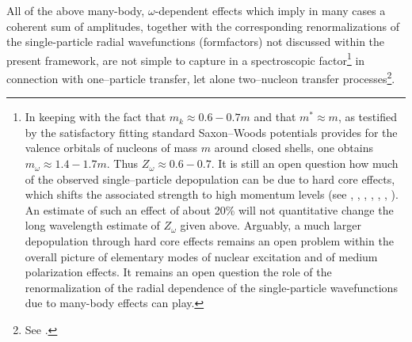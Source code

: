 All of the above many-body, $\omega$-dependent effects which imply in many cases a coherent sum of amplitudes, together with the corresponding renormalizations of the single-particle radial wavefunctions (formfactors) not discussed within the present framework, are not simple to capture in a spectroscopic factor\footnote{In keeping with the fact that $m_k\approx 0.6-0.7 m$ and that $m^*\approx m$, as testified by the satisfactory fitting standard Saxon--Woods potentials provides for the valence orbitals of nucleons of mass $m$ around closed shells, one obtains $m_\omega\approx 1.4-1.7 m$. Thus $Z_\omega \approx 0.6-0.7$. It is still an open question how much of the observed single--particle depopulation can be due to hard core effects, which shifts the associated strength to high momentum levels (see \cite{Dickhoff:05}, \cite{Jenning:11}, \cite{Kramer:01}, \cite{Barbieri:09}, \cite{Schiffer:12}, \cite{Duguet:12}, \cite{Furnstahl:10}).  An estimate of such an effect of about 20\% will not quantitative change the long wavelength estimate of $Z_\omega$ given above. Arguably, a much larger depopulation through hard core effects remains an open problem within the overall picture of elementary modes of nuclear excitation and of medium polarization effects. It remains an open question  the role of the renormalization of the radial dependence of the single-particle wavefunctions due to many-body effects can play.} in connection with one--particle transfer, let alone two--nucleon transfer processes\footnote{See \cite{Barranco:05,Barranco:99}.}. 






